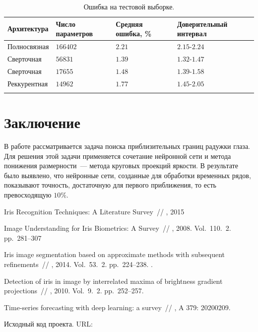 \documentclass[12pt, twoside]{article}
\begin{document}
\begin{longtable}[]{@{}llll@{}}
\toprule
Архитектура & Число параметров & Средняя ошибка, \% & Доверительный интервал\tabularnewline
\midrule
\endhead
Полносвязная & $166402$ & $2.21$ & $2.15$-$2.24$\tabularnewline
Сверточная & $56831$\ & $1.39$ & $1.32$-$1.47$\tabularnewline
Сверточная & $17655$ & $1.48$ & $1.39$-$1.58$\tabularnewline
Реккурентная & $14962$ & $1.77$ & $1.45$-$2.05$\tabularnewline
\bottomrule
\caption{Ошибка на тестовой выборке.}
\label{table:error}
\end{longtable}

\section{Заключение}
В работе рассматривается задача поиска приблизительных границ радужки глаза. Для решения этой задачи применяется сочетание нейронной сети и метода понижения размерности~--- метода круговых проекций яркости. В результате было выявлено, что нейронные сети, созданные для обработки временных рядов, показывают точность, достаточную для первого приближения, то есть превосходящую $10\%$.

\begin{thebibliography}{99}


   Iris Recognition Techniques: A Literature Survey~//
    , 2015

   Image Understanding for Iris Biometrics: A Survey~//
    , 2008. Vol.~110. \No\,2. pp.~281--307
	
   Iris image segmentation based on approximate methods
with subsequent refinements~//
    , 2014. Vol.~53. \No\,2. pp.~224--238.
	.
	
   Detection of iris in image by interrelated maxima of brightness gradient projections~//
    , 2010. Vol.~9. \No\,2. pp.~252--257.
    
    Time-series forecasting with deep learning: a survey~//
	, A 379: 20200209.
	
	Исходный код проекта.
	URL: 
 
 	
\end{thebibliography}

\end{document}
